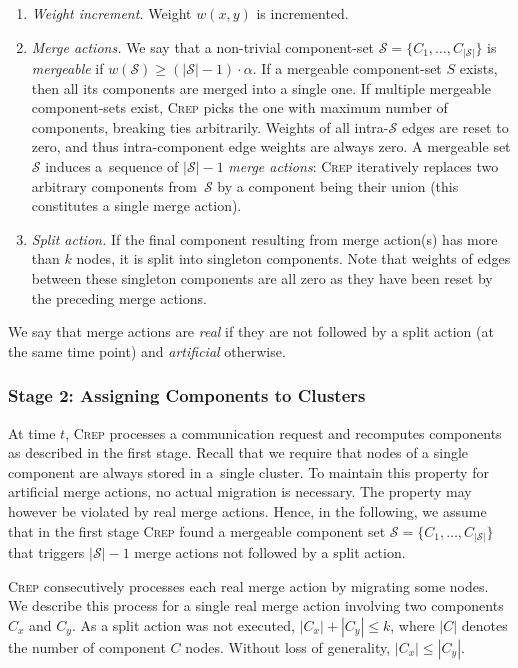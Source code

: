 \documentclass{siamart190516}
\newcommand{\CREP}{\textsc{Crep}\xspace}
\newcommand{\set}{\mathcal{S}}
\begin{document}
\begin{enumerate}

\item \emph{Weight increment.} Weight $w(x,y)$ is incremented.

\item \emph{Merge actions.} We say that a non-trivial component-set $\set = \{
C_1, \ldots, C_{|\set|} \}$ is \emph{mergeable} if $w(\set) \geq
(|\set|-1) \cdot \alpha$. If a mergeable component-set $S$ exists, then all its
components are merged into a single one. If multiple mergeable component-sets
exist, \CREP picks the one with maximum number of components, breaking ties
arbitrarily. Weights of all intra-$\set$ edges are reset to zero, and thus
intra-component edge weights are always zero. A mergeable set $\set$ induces
a~sequence of $|\set|-1$ \emph{merge actions}:
\CREP iteratively replaces two arbitrary components 
from~$\set$ by a component being their union (this constitutes a single merge
action).

\item \emph{Split action.} If the final component resulting from merge action(s)
has more than $k$ nodes, it is split into singleton
components. Note that weights of edges between these singleton components are
all zero as they have been reset by the preceding merge actions.

\end{enumerate}

We say that merge actions are \emph{real} if they are not followed
by a split action (at the same time point) and \emph{artificial} otherwise. 



\subsubsection{Stage 2: Assigning Components to Clusters}

At time $t$, \CREP processes a communication request and recomputes components
as described in the first stage. Recall that we require that nodes of a single
component are always stored in a~single cluster. To maintain this property for
artificial merge actions, no actual migration is necessary. The property may
however be violated by real merge actions. Hence, in the following, we assume
that in the first stage \CREP found a mergeable component set $\set = \{ C_1, 
\ldots, C_{|\set|} \}$ that triggers $|\set|-1$ merge actions not 
followed by a split action.

\CREP consecutively processes each real merge action by migrating some nodes.
We describe this process for a single real merge action involving two
components $C_x$ and $C_y$. As a split action was not executed, $|C_x| +
|C_y| \leq k$, where $|C|$ denotes the number of component $C$ nodes.
Without loss of generality, $|C_x| \leq |C_y|$.
\end{document}
